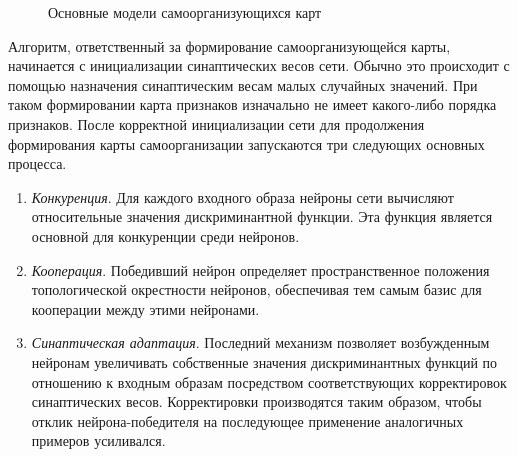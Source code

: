 \documentclass[a4paper,12pt]{report}
\begin{document}
\begin{figure}[!htb]
{{
        }
    }
    \caption{Основные модели самоорганизующихся карт}
    \label{fig:som models}
\end{figure}

Алгоритм, ответственный за формирование самоорганизующейся карты,
начинается с инициализации синаптических весов сети. Обычно это
происходит с помощью назначения синаптическим весам малых случайных
значений. При таком формировании карта признаков изначально не имеет
какого-либо порядка признаков. После корректной инициализации сети для
продолжения формирования карты самоорганизации запускаются три
следующих основных процесса.
\begin{enumerate}
    \item \textit{Конкуренция}. Для каждого входного образа нейроны
        сети вычисляют относительные значения дискриминантной функции.
        Эта функция является основной для конкуренции среди нейронов.
    \item \textit{Кооперация}. Победивший нейрон определяет
        пространственное положения топологической окрестности
        нейронов, обеспечивая тем самым базис для кооперации между
        этими нейронами.
    \item \textit{Синаптическая адаптация}. Последний механизм
        позволяет возбужденным нейронам увеличивать собственные
        значения дискриминантных функций по отношению к входным
        образам посредством соответствующих корректировок
        синаптических весов. Корректировки производятся таким образом,
        чтобы отклик нейрона-победителя на последующее применение
        аналогичных примеров усиливался.
\end{enumerate}
\end{document}
